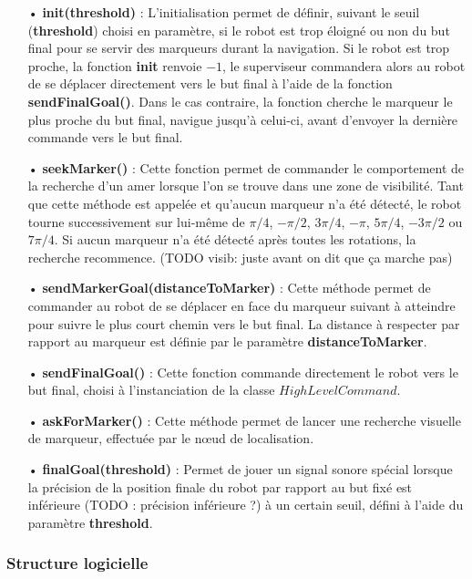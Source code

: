 \documentclass[10pt,a4paper]{article}
\begin{document}
\begin{itemize}
\item[•] \textbf{init(threshold)} : L'initialisation permet de définir, suivant le seuil (\textbf{threshold}) choisi en paramètre, si le robot est trop éloigné ou non du but final pour se servir des marqueurs durant la navigation. Si le robot est trop proche, la fonction \textbf{init} renvoie $-1$, le superviseur commandera alors au robot de se déplacer directement vers le but final à l'aide de la fonction \textbf{sendFinalGoal()}. Dans le cas contraire, la fonction cherche le marqueur le plus proche du but final, navigue jusqu'à celui-ci, avant d'envoyer la dernière commande vers le but final.
\item[•] \textbf{seekMarker()} : Cette fonction permet de commander le comportement de la recherche d'un amer lorsque l'on se trouve dans une zone de visibilité. Tant que cette méthode est appelée et qu'aucun marqueur n'a été détecté, le robot tourne successivement sur lui-même de $\pi/4$, $-\pi/2$, $3\pi/4$, $-\pi$, $5\pi/4$, $-3\pi/2$ ou $7\pi/4$. Si aucun marqueur n'a été détecté après toutes les rotations, la recherche recommence. (TODO visib: juste avant on dit que ça marche pas)
\item[•] \textbf{sendMarkerGoal(distanceToMarker)} : Cette méthode permet de commander au robot de se déplacer en face du marqueur suivant à atteindre pour suivre le plus court chemin vers le but final. La distance à respecter par rapport au marqueur est définie par le paramètre \textbf{distanceToMarker}. 
\item[•] \textbf{sendFinalGoal()} : Cette fonction commande directement le robot vers le but final, choisi à l'instanciation de la classe $HighLevelCommand$.
\item[•] \textbf{askForMarker()} :  Cette méthode permet de lancer une recherche visuelle de marqueur, effectuée par le nœud de localisation.
\item[•] \textbf{finalGoal(threshold)} : Permet de jouer un signal sonore spécial lorsque la précision de la position finale du robot par rapport au but fixé est inférieure (TODO : précision inférieure ?) à un certain seuil, défini à l'aide du paramètre \textbf{threshold}.
\end{itemize}

\newpage
\subsubsection{Structure logicielle}
\label{sec:StructureLogicielle}
\end{document}
